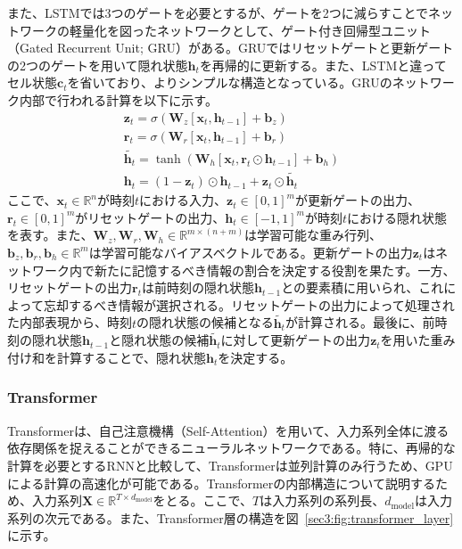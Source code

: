 \documentclass[12pt]{jarticle}
\numberwithin{equation}{section}    %
\numberwithin{figure}{section}      %
\numberwithin{table}{section}      %
\begin{document}
また、LSTMでは3つのゲートを必要とするが、ゲートを2つに減らすことでネットワークの軽量化を図ったネットワークとして、ゲート付き回帰型ユニット（Gated Recurrent Unit; GRU）\cite{cho2014learning}がある。GRUではリセットゲートと更新ゲートの2つのゲートを用いて隠れ状態$\bm{h}_{t}$を再帰的に更新する。また、LSTMと違ってセル状態$\bm{c}_{t}$を省いており、よりシンプルな構造となっている。GRUのネットワーク内部で行われる計算を以下に示す。
\begin{gather}
    \bm{z}_{t} = \sigma(\bm{W}_{z}[\bm{x}_{t}, \bm{h}_{t-1}] + \bm{b}_{z}) \\
    \bm{r}_{t} = \sigma(\bm{W}_{r}[\bm{x}_{t}, \bm{h}_{t-1}] + \bm{b}_{r}) \\
    \tilde{\bm{h}_{t}} = \tanh(\bm{W}_{h}[\bm{x}_{t}, \bm{r}_{t} \odot \bm{h}_{t-1}] + \bm{b}_{h}) \\
    \bm{h}_{t} = (1 - \bm{z}_{t}) \odot \bm{h}_{t-1} + \bm{z}_{t} \odot \tilde{\bm{h}_{t}}
\end{gather}
ここで、$\bm{x}_{t} \in \mathbb{R}^{n}$が時刻$t$における入力、$\bm{z}_{t} \in [0, 1]^{m}$が更新ゲートの出力、$\bm{r}_{t} \in [0, 1]^{m}$がリセットゲートの出力、$\bm{h}_{t} \in [-1, 1]^{m}$が時刻$t$における隠れ状態を表す。また、$\bm{W}_{z}, \bm{W}_{r}, \bm{W}_{h} \in \mathbb{R}^{m \times (n + m)}$は学習可能な重み行列、$\bm{b}_{z}, \bm{b}_{r}, \bm{b}_{h} \in \mathbb{R}^{m}$は学習可能なバイアスベクトルである。更新ゲートの出力$\bm{z}_{t}$はネットワーク内で新たに記憶するべき情報の割合を決定する役割を果たす。一方、リセットゲートの出力$\bm{r}_{t}$は前時刻の隠れ状態$\bm{h}_{t-1}$との要素積に用いられ、これによって忘却するべき情報が選択される。リセットゲートの出力によって処理された内部表現から、時刻$t$の隠れ状態の候補となる$\tilde{\bm{h}_{t}}$が計算される。最後に、前時刻の隠れ状態$\bm{h}_{t-1}$と隠れ状態の候補$\tilde{\bm{h}_{t}}$に対して更新ゲートの出力$\bm{z}_{t}$を用いた重み付け和を計算することで、隠れ状態$\bm{h}_{t}$を決定する。

\subsubsection{Transformer}
Transformer\cite{vaswani2017attention}は、自己注意機構（Self-Attention）を用いて、入力系列全体に渡る依存関係を捉えることができるニューラルネットワークである。特に、再帰的な計算を必要とするRNNと比較して、Transformerは並列計算のみ行うため、GPUによる計算の高速化が可能である。Transformerの内部構造について説明するため、入力系列$\bm{X} \in \mathbb{R}^{T \times d_{\text{model}}}$をとる。ここで、$T$は入力系列の系列長、$d_{\text{model}}$は入力系列の次元である。また、Transformer層の構造を図~\ref{sec3:fig:transformer_layer}に示す。
\end{document}
